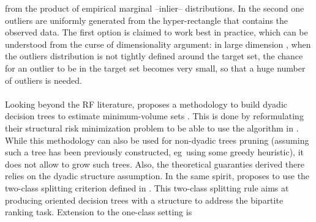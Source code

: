 from the product of empirical marginal --inlier-- distributions. In the second
one outliers are uniformly generated from the hyper-rectangle that contains
the observed data. The first option is claimed to work best in practice, which
can be understood from the curse of dimensionality argument:
%
in large dimension \citep{Tax2002}, when the outliers distribution is not
tightly defined around the target set, the chance for an outlier to be in the
target set becomes very small, so that a huge number of outliers is needed.
%
\paragraph{}
Looking beyond the \ac{RF} literature, \citet{Scott2006} proposes a
methodology to build dyadic decision trees to estimate minimum-volume sets
\citep{Polonik97, Einmahl1992}. This is done by reformulating their structural
risk minimization problem to be able to use the algorithm in
\citet{Blanchard2004}.  While this methodology can also be used for non-dyadic
trees pruning (assuming such a tree has been previously constructed,
\acs{eg}~using some greedy heuristic), it does not allow to grow such trees.
%
Also, the theoretical guaranties derived there relies on the dyadic structure
assumption.
%
%
In the same spirit, \citet{CLEM14} proposes to use the two-class splitting
criterion defined in \citet{Clemencon2009Tree}. This two-class splitting rule
aims at producing oriented decision trees with a  structure
to address the bipartite ranking task.  Extension to the one-class setting is
